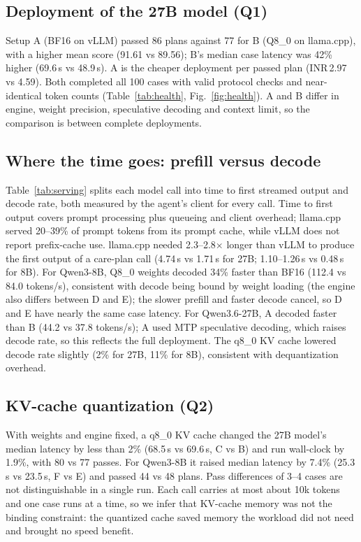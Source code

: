 \documentclass[conference]{IEEEtran}
\begin{document}
\subsection{Deployment of the 27B model (Q1)}
Setup A (BF16 on vLLM) passed 86 plans against 77 for B (Q8\_0 on llama.cpp), with a higher mean score (91.61 vs 89.56); B's median case latency was 42\% higher (69.6\,s vs 48.9\,s). A is the cheaper deployment per passed plan (INR\,2.97 vs 4.59). Both completed all 100 cases with valid protocol checks and near-identical token counts (Table~\ref{tab:health}, Fig.~\ref{fig:health}). A and B differ in engine, weight precision, speculative decoding and context limit, so the comparison is between complete deployments.

\subsection{Where the time goes: prefill versus decode}
Table~\ref{tab:serving} splits each model call into time to first streamed output and decode rate, both measured by the agent's client for every call. Time to first output covers prompt processing plus queueing and client overhead; llama.cpp served 20--39\% of prompt tokens from its prompt cache, while vLLM does not report prefix-cache use. llama.cpp needed 2.3--2.8$\times$ longer than vLLM to produce the first output of a care-plan call (4.74\,s vs 1.71\,s for 27B; 1.10--1.26\,s vs 0.48\,s for 8B). For Qwen3-8B, Q8\_0 weights decoded 34\% faster than BF16 (112.4 vs 84.0 tokens/s), consistent with decode being bound by weight loading (the engine also differs between D and E); the slower prefill and faster decode cancel, so D and E have nearly the same case latency. For Qwen3.6-27B, A decoded faster than B (44.2 vs 37.8 tokens/s); A used MTP speculative decoding, which raises decode rate, so this reflects the full deployment. The q8\_0 KV cache lowered decode rate slightly (2\% for 27B, 11\% for 8B), consistent with dequantization overhead.

\begin{table}[t]
\caption{Per-call serving metrics (medians, client-measured)}
\label{tab:serving}
\centering\scriptsize
\setlength{\tabcolsep}{3.6pt}

\end{table}

\subsection{KV-cache quantization (Q2)}
With weights and engine fixed, a q8\_0 KV cache changed the 27B model's median latency by less than 2\% (68.5\,s vs 69.6\,s, C vs B) and run wall-clock by 1.9\%, with 80 vs 77 passes. For Qwen3-8B it raised median latency by 7.4\% (25.3\,s vs 23.5\,s, F vs E) and passed 44 vs 48 plans. Pass differences of 3--4 cases are not distinguishable in a single run. Each call carries at most about 10k tokens and one case runs at a time, so we infer that KV-cache memory was not the binding constraint: the quantized cache saved memory the workload did not need and brought no speed benefit.
\end{document}
